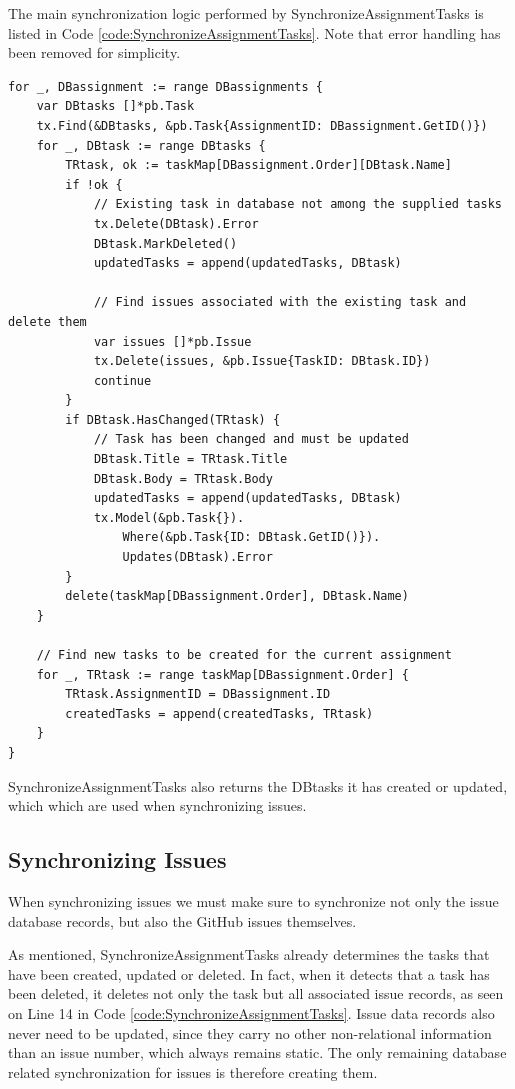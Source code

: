The main synchronization logic performed by SynchronizeAssignmentTasks is listed in Code \ref{code:SynchronizeAssignmentTasks}.
Note that error handling has been removed for simplicity.

\begin{lstlisting}[caption={Task synchronization performed by SynchronizeAssignmentTasks}, 
                            language=Golang, label={code:SynchronizeAssignmentTasks},
                            commentstyle={\slshape}]
for _, DBassignment := range DBassignments {
	var DBtasks []*pb.Task
	tx.Find(&DBtasks, &pb.Task{AssignmentID: DBassignment.GetID()})
	for _, DBtask := range DBtasks {
		TRtask, ok := taskMap[DBassignment.Order][DBtask.Name]
		if !ok {
			// Existing task in database not among the supplied tasks
			tx.Delete(DBtask).Error
			DBtask.MarkDeleted()
			updatedTasks = append(updatedTasks, DBtask)
			
			// Find issues associated with the existing task and delete them
			var issues []*pb.Issue
			tx.Delete(issues, &pb.Issue{TaskID: DBtask.ID})
			continue
		}
		if DBtask.HasChanged(TRtask) {
			// Task has been changed and must be updated
			DBtask.Title = TRtask.Title
			DBtask.Body = TRtask.Body
			updatedTasks = append(updatedTasks, DBtask)
			tx.Model(&pb.Task{}).
				Where(&pb.Task{ID: DBtask.GetID()}).
				Updates(DBtask).Error
		}
		delete(taskMap[DBassignment.Order], DBtask.Name)
	}

	// Find new tasks to be created for the current assignment
	for _, TRtask := range taskMap[DBassignment.Order] {
		TRtask.AssignmentID = DBassignment.ID
		createdTasks = append(createdTasks, TRtask)
	}
}
\end{lstlisting}

SynchronizeAssignmentTasks also returns the DBtasks it has created or updated, which which are used when synchronizing issues.

\subsection{Synchronizing Issues}

When synchronizing issues we must make sure to synchronize not only the issue database records, but also the GitHub issues themselves.

As mentioned, SynchronizeAssignmentTasks already determines the tasks that have been created, updated or deleted.
In fact, when it detects that a task has been deleted, it deletes not only the task but all associated issue records, as seen on Line 14 in Code \ref{code:SynchronizeAssignmentTasks}.
Issue data records also never need to be updated, since they carry no other non-relational information than an issue number, which always remains static.
The only remaining database related synchronization for issues is therefore creating them.

